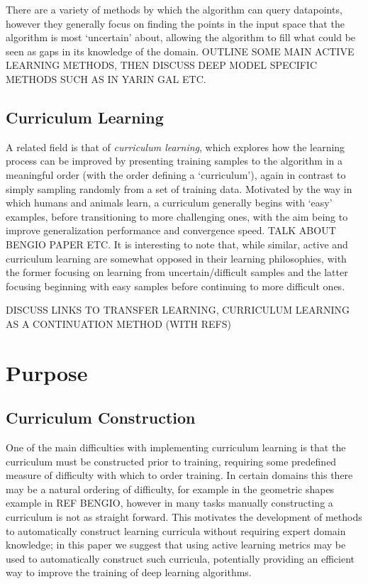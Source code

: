 \documentclass[a4paper,11pt]{article}
\begin{document}
There are a variety of methods by which the algorithm can query datapoints, however they generally focus on finding the points in the input space that the algorithm is most `uncertain' about, allowing the algorithm to fill what could be seen as gaps in its knowledge of the domain. OUTLINE SOME MAIN ACTIVE LEARNING METHODS, THEN DISCUSS DEEP MODEL SPECIFIC METHODS SUCH AS IN YARIN GAL ETC.

\subsection{Curriculum Learning}
A related field is that of \textit{curriculum learning}, which explores how the learning process can be improved by presenting training samples to the algorithm in a meaningful order (with the order defining a `curriculum'), again in contrast to simply sampling randomly from a set of training data. Motivated by the way in which humans and animals learn, a curriculum generally begins with `easy' examples, before transitioning to more challenging ones, with the aim being to improve generalization performance and convergence speed. TALK ABOUT BENGIO PAPER ETC. It is interesting to note that, while similar, active and curriculum learning are somewhat opposed in their learning philosophies, with the former focusing on learning from uncertain/difficult samples and the latter focusing beginning with easy samples before continuing to more difficult ones.

DISCUSS LINKS TO TRANSFER LEARNING, CURRICULUM LEARNING AS A CONTINUATION METHOD (WITH REFS)

\section{Purpose}
\subsection{Curriculum Construction}
One of the main difficulties with implementing curriculum learning is that the curriculum must be constructed prior to training, requiring some predefined measure of difficulty with which to order training. In certain domains this there may be a natural ordering of difficulty, for example in the geometric shapes example in REF BENGIO, however in many tasks manually constructing a curriculum is not as straight forward. This motivates the development of methods to automatically construct learning curricula without requiring expert domain knowledge; in this paper we suggest that using active learning metrics may be used to automatically construct such curricula, potentially providing an efficient way to improve the training of deep learning algorithms. 
\end{document}

